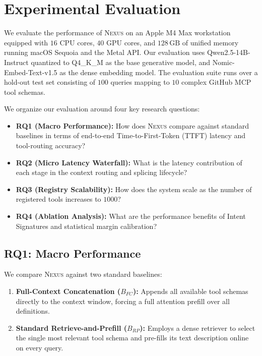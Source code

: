 \section{Experimental Evaluation}
\label{sec:evaluation}

We evaluate the performance of \textsc{Nexus} on an Apple M4 Max workstation equipped with $16$ CPU cores, $40$ GPU cores, and $128\,\text{GB}$ of unified memory running macOS Sequoia and the Metal API. Our evaluation uses Qwen2.5-14B-Instruct quantized to Q4\_K\_M as the base generative model, and Nomic-Embed-Text-v1.5 as the dense embedding model. The evaluation suite runs over a hold-out test set consisting of $100$ queries mapping to $10$ complex GitHub MCP tool schemas.

We organize our evaluation around four key research questions:
\begin{itemize}
  \item \textbf{RQ1 (Macro Performance):} How does \textsc{Nexus} compare against standard baselines in terms of end-to-end Time-to-First-Token (TTFT) latency and tool-routing accuracy?
  \item \textbf{RQ2 (Micro Latency Waterfall):} What is the latency contribution of each stage in the context routing and splicing lifecycle?
  \item \textbf{RQ3 (Registry Scalability):} How does the system scale as the number of registered tools increases to $1000$?
  \item \textbf{RQ4 (Ablation Analysis):} What are the performance benefits of Intent Signatures and statistical margin calibration?
\end{itemize}



\subsection{RQ1: Macro Performance}
We compare \textsc{Nexus} against two standard baselines:
\begin{enumerate}
  \item \textbf{Full-Context Concatenation ($B_{FC}$):} Appends all available tool schemas directly to the context window, forcing a full attention prefill over all definitions.
  \item \textbf{Standard Retrieve-and-Prefill ($B_{RP}$):} Employs a dense retriever to select the single most relevant tool schema and pre-fills its text description online on every query.
\end{enumerate}

